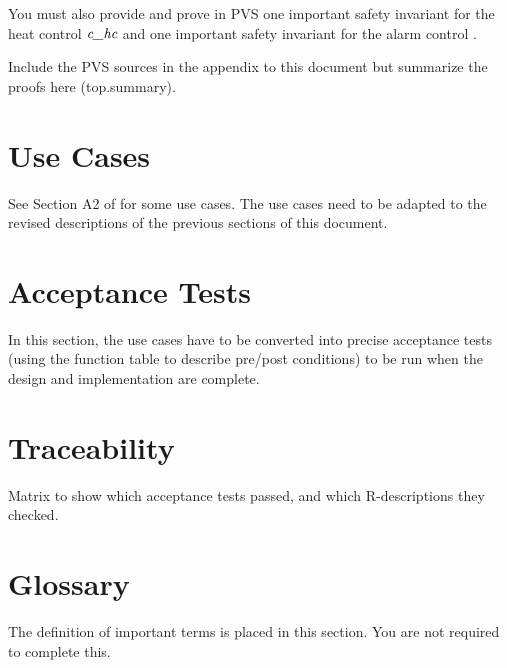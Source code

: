 \documentclass[fontsize=12pt,paper=letter,twoside]{scrartcl}
\begin{document}
You must also provide and prove in PVS one important safety invariant for the heat control $\textit{c\_hc}$ and one important safety invariant for the alarm control .

Include the PVS sources in the appendix to this document but summarize the proofs here (top.summary).

\newpage 
\section{Use Cases}

See Section A2 of \cite{REMH} for some use cases. The use cases need to be adapted to the revised descriptions of the previous sections of this document.

\section{Acceptance Tests}

In this section, the use cases have to be converted into precise acceptance tests (using the function table to describe pre/post conditions) to be run when the design and implementation are complete.

\section{Traceability}

Matrix to show which acceptance tests passed, and which R-descriptions they checked.


\section{Glossary}

The definition of important terms is placed in this section. You are not required to complete this.
\newpage



\newpage
\appendix 




\end{document}
